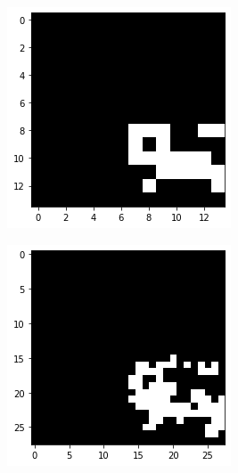 \documentclass[10pt,twocolumn,hidelinks,letterpaper]{article}
\begin{document}
\begin{figure}[t]
\begin{subfigure}{.57\linewidth}
\begin{subfigure}{.32\linewidth}
  	\end{subfigure}
  	\begin{subfigure}{.32\linewidth}
  		\includegraphics[width=\linewidth]{images/mmaps_example/downsampling14x14_bw.png}
  	\end{subfigure}
  	\begin{subfigure}{.32\linewidth}
  		\includegraphics[width=\linewidth]{images/mmaps_example/downsampling28x28_bw.png}

\end{subfigure}
\end{subfigure}
\end{figure}
\end{document}
